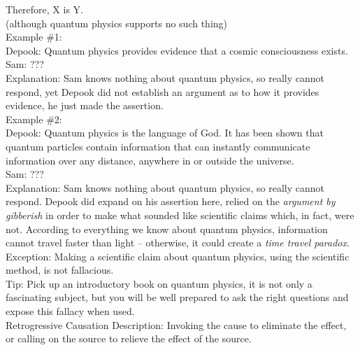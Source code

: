 \documentclass[a4paper,12pt,single,pdftex]{scrartcl}
\begin{document}
      
        Therefore, X is Y.
      \\

      
        (although quantum physics supports no such thing)
      \\

      
        Example \#1:
      \\

      
        Depook: Quantum physics provides evidence that a cosmic consciousness exists.
      \\

      
        Sam: ???
      \\

      
        Explanation: Sam knows nothing about quantum physics, so really cannot respond, yet Depook did not establish an argument as to how it provides evidence, he just made the assertion. 
      \\

      
        Example \#2:
      \\

      
        Depook: Quantum physics is the language of God.  It has been shown that quantum particles contain information that can instantly communicate information over any distance, anywhere in or outside the universe.
      \\

      
        Sam: ???
      \\

      
        Explanation: Sam knows nothing about quantum physics, so really cannot respond.  Depook did expand on his assertion here, relied on the {\it argument by gibberish} in order to make what sounded like scientific claims which, in fact, were not.  According to everything we know about quantum physics, information cannot travel faster than light -- otherwise, it could create a {\it time travel paradox}.
      \\

      
        Exception: Making a scientific claim about quantum physics, using the scientific method, is not fallacious.
      \\

      
        Tip: Pick up an introductory book on quantum physics, it is not only a fascinating subject, but you will be well prepared to ask the right questions and expose this fallacy when used.
      \\

    
  

Retrogressive Causation
    Description: Invoking the cause to eliminate the effect, or calling on the source to relieve the effect of the source.
\end{document}
